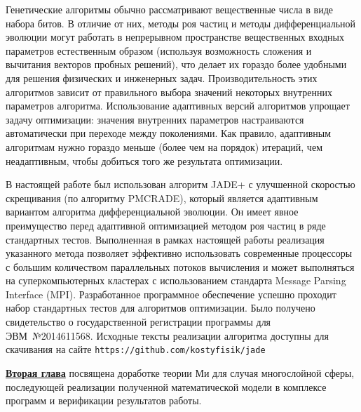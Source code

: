 Генетические алгоритмы обычно рассматривают вещественные числа в виде
набора битов.  В отличие от них, методы роя частиц и методы
дифференциальной эволюции могут работать в непрерывном пространстве
вещественных входных параметров естественным образом (используя
возможность сложения и вычитания векторов пробных решений), что делает
их гораздо более удобными для решения физических и инженерных
задач.  Производительность этих алгоритмов зависит от правильного
выбора значений некоторых внутренних параметров
алгоритма.  Использование адаптивных версий алгоритмов упрощает задачу
оптимизации: значения внутренних параметров настраиваются
автоматически при переходе между поколениями. Как правило, адаптивным
алгоритмам нужно гораздо меньше (более чем на порядок) итераций, чем
неадаптивным, чтобы добиться того же результата оптимизации.

В настоящей работе был использован алгоритм JADE+ с улучшенной
скоростью скрещивания (по алгоритму PMCRADE), который является
адаптивным вариантом алгоритма дифференциальной эволюции. Он имеет
явное преимущество перед адаптивной оптимизацией методом роя частиц в
ряде стандартных тестов.  Выполненная в рамках настоящей работы
реализация указанного метода позволяет эффективно использовать
современные процессоры с большим количеством параллельных потоков
вычисления и может выполняться на суперкомпьютерных кластерах с
использованием стандарта Message Parsing Interface (MPI).
Разработанное программное обеспечение успешно проходит набор
стандартных тестов для алгоритмов оптимизации.  Было получено
свидетельство о государственной регистрации программы для
ЭВМ~№2014611568.  Исходные тексты реализации алгоритма доступны для
скачивания на сайте \verb+https://github.com/kostyfisik/jade+

\underline{\textbf{Вторая глава}} посвящена доработке теории Ми для
случая многослойной сферы, последующей реализации полученной
математической модели в комплексе программ и верификации результатов
работы.

